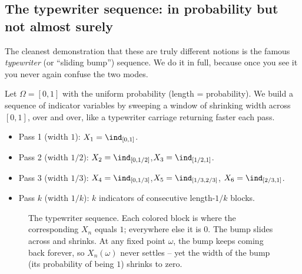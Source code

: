 \subsection{The typewriter sequence: in probability but not almost surely}
\label{ch22:typewriter}

The cleanest demonstration that these are truly different notions is the famous
\emph{typewriter} (or ``sliding bump'') sequence. We do it in full, because once you
see it you never again confuse the two modes.

Let $\Omega = [0,1]$ with the uniform probability (length = probability). We build a
sequence of indicator variables by sweeping a window of shrinking width across
$[0,1]$, over and over, like a typewriter carriage returning faster each pass.

\begin{itemize}
\item Pass 1 (width $1$): $X_1 = \ind_{[0,1]}$.
\item Pass 2 (width $1/2$): $X_2 = \ind_{[0,1/2]}$,\quad $X_3 = \ind_{[1/2,1]}$.
\item Pass 3 (width $1/3$): $X_4 = \ind_{[0,1/3]}$,\quad $X_5 = \ind_{[1/3,2/3]}$,\quad
      $X_6 = \ind_{[2/3,1]}$.
\item Pass $k$ (width $1/k$): $k$ indicators of consecutive length-$1/k$ blocks.
\end{itemize}

\begin{figure}[H]
\centering
{}
\caption{The typewriter sequence. Each colored block is where the corresponding
$X_n$ equals $1$; everywhere else it is $0$. The bump slides across and shrinks. At
any fixed point $\omega$, the bump keeps coming back forever, so $X_n(\omega)$ never
settles -- yet the width of the bump (its probability of being $1$) shrinks to zero.}
\label{ch22:fig-typewriter}
\end{figure}

